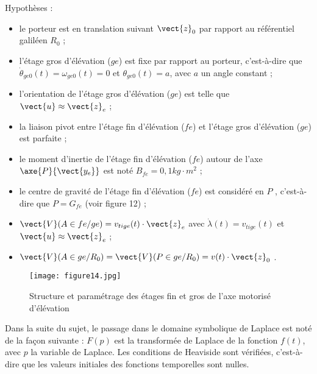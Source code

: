 Hypothèses :
\begin{itemize}
\item le porteur est en translation suivant $\vect{z}_0$ par rapport au référentiel galiléen $R_0$ ;
\item l'étage gros d'élévation ($ge$) est fixe par rapport au porteur, c'est-à-dire que $\dot{\theta}_{ge0}(t)=\omega_{ge0}(t)=0$ et
$\theta_{ge0}(t) = a$, avec $a$ un angle constant ;
\item l'orientation de l'étage gros d'élévation ($ge$) est telle que $\vect{u}\approx \vect{z}_e$ ;
\item la liaison pivot entre l'étage fin d'élévation ($fe$) et l'étage gros d'élévation ($ge$) est parfaite ;
\item le moment d'inertie de l'étage fin d'élévation ($fe$) autour de l'axe $\axe{P}{\vect{y_e}}$ est noté $B_{fe}=0,1kg\cdot m^2$ ;
\item le centre de gravité de l'étage fin d'élévation ($fe$) est considéré en $P$ , c'est-à-dire que $P=G_{fe}$ (voir figure 12) ;
\item $\vect{V}(A\in fe/ge)=v_{tige}(t)\cdot \vect{z}_e$ avec $\dot{\lambda}(t)=v_{tige}(t)$ et $\vect{u}\approx \vect{z}_e$ ;
\item $\vect{V}(A\in ge/R_0)=\vect{V}(P\in ge/R_0)=v(t)\cdot \vect{z}_0$ .
\end{itemize}


\begin{figure}[!htb]
\begin{center}
\texttt{[image: figure14.jpg]}
\caption{Structure et paramétrage des étages fin et gros de l'axe motorisé d'élévation \label{figure14}}
\end{center}
\end{figure}


Dans la suite du sujet, le passage dans le domaine symbolique de Laplace est noté de la façon suivante : $F(p)$
est la transformée de Laplace de la fonction $f(t)$, avec $p$ la variable de Laplace. Les conditions de Heaviside sont
vérifiées, c'est-à-dire que les valeurs initiales des fonctions temporelles sont nulles.


